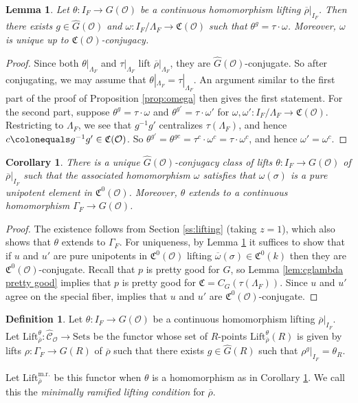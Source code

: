 \documentclass[11pt, letterpaper,english]{amsart}
\theoremstyle{plain}
\newtheorem{lemma}[lem]{Lemma}
\newtheorem{cor}[lem]{Corollary}
\theoremstyle{definition}
\newtheorem{defn}[lem]{Definition}
\numberwithin{equation}{section}
\numberwithin{lem}{section}
\newcommand{\fC}{\mathfrak{C}}
\newcommand{\cC}{\mathcal{C}}
\newcommand{\cO}{\mathcal{O}}
\newcommand{\rhobar}{{\overline{\rho}}}
\newcommand{\omegabar}{{\overline{\omega}}}
\newcommand{\gma}[1]{\Gamma_{#1}}
\newcommand{\cent}[2]{C_{#1}(#2)}
\newcommand{\Ld}{\Lambda}
\DeclareMathOperator{\mr}{m.r.}
\renewcommand{\mr}{\operatorname{m.r.}}
\begin{document}
\begin{lemma} \label{lem:omega over rings}
Let $\theta \colon I_F \to G(\cO)$ be a continuous homomorphism lifting $\rhobar|_{I_F}$. Then there exists $g \in \widehat G(\cO)$ and $\omega \colon I_F/\Ld_F \to \fC(\cO)$ such that 
$\theta^g = \tau \cdot \omega$. 
Moreover, $\omega$ is unique up to $\fC(\cO)$-conjugacy.
\end{lemma}

\begin{proof}
Since both $\theta|_{\Ld_F}$ and $\tau|_{\Ld_F}$ lift $\rhobar|_{\Ld_F}$, they are $\widehat G(\cO)$-conjugate. So after conjugating, we may assume that $\theta|_{\Ld_F}=\tau|_{\Ld_F}$. An argument similar to the first part of the proof of Proposition \ref{prop:omega} then gives the first statement. For the second part, suppose $\theta^g=\tau \cdot \omega$ and $\theta^{g'}=\tau \cdot \omega'$ for $\omega, \omega' \colon I_F/\Ld_F \to \fC(\cO)$. 
Restricting to $\Ld_F$, we see that $g^{-1}g'$ centralizes $\tau(\Ld_F)$, and hence $c \colonequals g^{-1}g' \in \fC(\cO)$. So $\theta^{g'}=\theta^{gc}=\tau^c \cdot \omega^c=\tau \cdot \omega^c$, and hence $\omega'=\omega^c$. 
\end{proof}

\begin{cor} \label{cor:unique theta}
There is a unique $\widehat G(\cO)$-conjugacy class of lifts $\theta \colon I_F \to G(\cO)$ of $\rhobar|_{I_F}$ such that the associated homomorphism $\omega$ satisfies that $\omega(\sigma)$ is a pure unipotent element in $\fC^0(\cO)$. Moreover, $\theta$ extends to a continuous homomorphism $\gma{F} \to G(\cO)$.
\end{cor}

\begin{proof}
The existence follows from Section \ref{ss:lifting} (taking $z=1$), which also shows that $\theta$ extends to $\gma{F}$.
For uniqueness, by Lemma \ref{lem:omega over rings} it suffices to show that if $u$ and $u'$ are pure unipotents in $\fC^0(\cO)$ lifting $\omegabar(\sigma) \in \fC^0(k)$ then they are $\fC^0(\cO)$-conjugate. 
Recall that $p$ is pretty good for $G$, so Lemma \ref{lem:cglambda pretty good} implies that $p$ is pretty good for $\fC=\cent{G}{\tau(\Ld_F)}$.
Since $u$ and $u'$ agree on the special fiber, \cite[Theorem 5.11]{cotner} implies that $u$ and $u'$ are $\fC^0(\cO)$-conjugate. 
\end{proof}

\begin{defn} \label{def:minimally ramified}
Let $\theta \colon I_F \to G(\cO)$ be a continuous homomorphism lifting $\rhobar|_{I_F}$.
Let $\mathrm{Lift}_{\rhobar}^{\theta} \colon \widehat{\cC}_{\cO} \to \textrm{Sets}$ be the functor whose set of $R$-points $\mathrm{Lift}_{\rhobar}^{\theta}(R)$ is given by lifts $\rho: \gma{F} \to G(R)$ of $\rhobar$ such that there exists $g \in \widehat{G}(R)$ such that $\rho^g|_{I_F}=\theta_R$.

Let $\mathrm{Lift}_{\rhobar}^{\mr}$ be this functor when $\theta$ is a homomorphism as in Corollary \ref{cor:unique theta}. We call this the \emph{minimally ramified lifting condition} for $\rhobar$. 
\end{defn}
\end{document}
